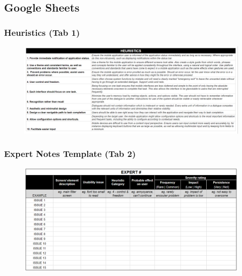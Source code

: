 \documentclass[a4 paper, 12pt]{article}
\begin{document}
    \pagebreak  
    \subsection{Google Sheets}
    \label{sec:C.4} 

    \subsubsection*{Heuristics (Tab 1)}
    \begin{figure} [H]
        \centering
        \includegraphics[width=\textwidth, frame]
            {./High_Fidelity/High_Heuristics.PNG}
    \end{figure}

    \subsubsection*{Expert Notes Template (Tab 2)}
    \begin{figure} [H]
        \centering
        \includegraphics[width=\textwidth, frame]
            {./High_Fidelity/High_Expert_Template.PNG}
    \end{figure}

    \pagebreak     
    
                \label{sec:C.5}
\end{document}
